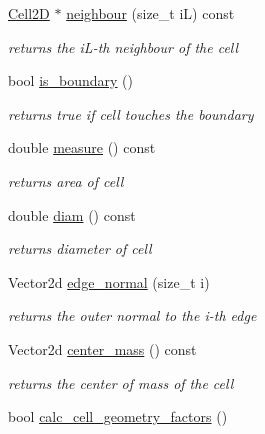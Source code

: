\begin{DoxyCompactItemize}
\hyperlink{classHArDCore2D_1_1Cell2D}{Cell2D} $\ast$ \hyperlink{classHArDCore2D_1_1Cell2D_abdd8c805f1e7f9643d8330342830ac7c}{neighbour} (size\+\_\+t iL) const
\begin{DoxyCompactList}\small\item\em returns the i\+L-\/th neighbour of the cell \end{DoxyCompactList}\item 
bool \hyperlink{group__Mesh2D_ga733ae701085975f6bc1f5ac33ef9f984}{is\+\_\+boundary} ()
\begin{DoxyCompactList}\small\item\em returns true if cell touches the boundary \end{DoxyCompactList}\item 
double \hyperlink{group__Mesh2D_ga2a06116757ca98552878eef4c1bb3694}{measure} () const
\begin{DoxyCompactList}\small\item\em returns area of cell \end{DoxyCompactList}\item 
double \hyperlink{group__Mesh2D_ga6ee4beb02e00b38ef4af808e2241aa6a}{diam} () const
\begin{DoxyCompactList}\small\item\em returns diameter of cell \end{DoxyCompactList}\item 
\mbox{\label{classHArDCore2D_1_1Cell2D_a50635f2a486a9af7aa89d6af4dc17422}} 
Vector2d \hyperlink{classHArDCore2D_1_1Cell2D_a50635f2a486a9af7aa89d6af4dc17422}{edge\+\_\+normal} (size\+\_\+t i)
\begin{DoxyCompactList}\small\item\em returns the outer normal to the i-\/th edge \end{DoxyCompactList}\item 
Vector2d \hyperlink{group__Mesh2D_gaea8651d1aa09dcea4701a35ecd032283}{center\+\_\+mass} () const
\begin{DoxyCompactList}\small\item\em returns the center of mass of the cell \end{DoxyCompactList}\item 
\mbox{\label{classHArDCore2D_1_1Cell2D_a5dd60b54738e447e922b8d4decfac5b2}} 
bool \hyperlink{classHArDCore2D_1_1Cell2D_a5dd60b54738e447e922b8d4decfac5b2}{calc\+\_\+cell\+\_\+geometry\+\_\+factors} ()

\end{DoxyCompactItemize}
